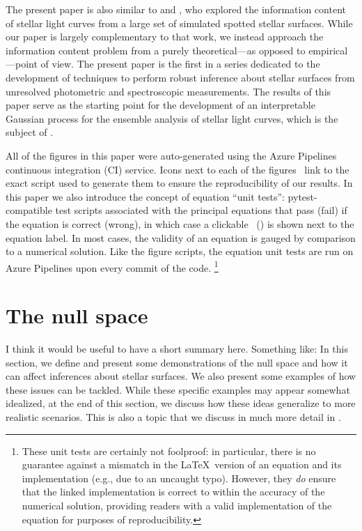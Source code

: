 \documentclass[modern]{aastex62}
\newcommand{\dfm}[1]{{\color{blue}#1}}
\begin{document}
The present paper is also similar to \citet{Walkowicz2013} and
\citet{Basri2020}, who explored the information content of
stellar light curves from a large set of simulated spotted stellar
surfaces. While our paper is largely complementary to
that work, we instead approach the information content problem from
a purely theoretical---as opposed to empirical---point of view.
%
The present paper is the first in a series dedicated to the development of
techniques to perform robust inference about stellar surfaces from
unresolved photometric and spectroscopic measurements. The results
of this paper serve as the starting point for the development of
an interpretable Gaussian process for the ensemble analysis of
stellar light curves, which is the subject of
.

\vspace{1em}

All of the figures in this paper were auto-generated
using the Azure Pipelines continuous integration (CI) service.
Icons next to each of the figures \codeicon \,
link to the exact script used to generate them to ensure the reproducibility
of our results. In this paper we also introduce the concept of equation
``unit tests'': \textsf{pytest}-compatible test scripts associated
with the principal equations that pass (fail) if the equation is correct (wrong),
in which case a clickable \testpassicon \, (\testfailicon) is shown next to the equation
label.
In most cases, the validity of an equation is gauged by comparison to
a numerical solution. Like the figure scripts, the equation unit tests are
run on Azure Pipelines upon every commit of the code.%
\footnote{
    These unit tests are certainly not foolproof: in particular, there is
    no guarantee against a mismatch in the \LaTeX \, version of an equation
    and its \Python implementation (e.g., due to an uncaught typo). However, they
    \emph{do} ensure that the linked \Python implementation is correct to
    within the accuracy of the numerical solution, providing readers with a
    valid implementation of the equation for purposes of reproducibility.
}

\section{The null space}
\label{sec:nullspace}

\dfm{I think it would be useful to have a short summary here.
    Something like: In this section, we define and present some demonstrations of the null space and how it can affect inferences about stellar surfaces.
    We also present some examples of how these issues can be tackled.
    While these specific examples may appear somewhat idealized, at the end of this section, we discuss how these ideas generalize to more realistic scenarios.
    This is also a topic that we discuss in much more detail in \citetalias{PaperII}.}
\end{document}
